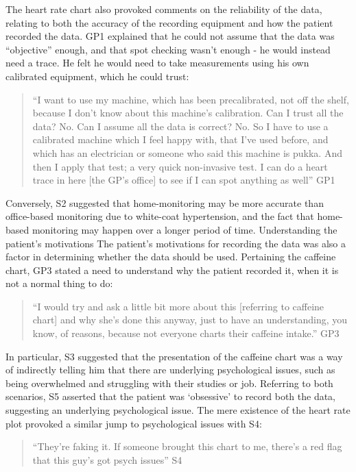 \documentclass{sigchi}
\begin{document}
The heart rate chart also provoked comments on the reliability of the data, relating to both the accuracy of the recording equipment and how the patient recorded the data. GP1 explained that he could not assume that the data was ``objective'' enough, and that spot checking wasn’t enough - he would instead need a trace. He felt he would need to take measurements using his own calibrated equipment, which he could trust:

\begin{quote}
    ``I want to use my machine, which has been precalibrated, not off the shelf, because I don't know about this machine's calibration. Can I trust all the data? No. Can I assume all the data is correct? No. So I have to use a calibrated machine which I feel happy with, that I've used before, and which has an electrician or someone who said this machine is pukka. And then I apply that test; a very quick non-invasive test. I can do a heart trace in here [the GP’s office] to see if I can spot anything as well'' GP1
\end{quote}

Conversely, S2 suggested that home-monitoring may be more accurate than office-based monitoring due to white-coat hypertension, and the fact that home-based monitoring may happen over a longer period of time.
Understanding the patient’s motivations
The patient’s motivations for recording the data was also a factor in determining whether the data should be used. Pertaining the caffeine chart, GP3 stated a need to understand why the patient recorded it, when it is not a normal thing to do:

\begin{quote}
    ``I would try and ask a little bit more about this [referring to caffeine chart] and why she's done this anyway, just to have an understanding, you know, of reasons, because not everyone charts their caffeine intake.'' GP3
\end{quote}

In particular, S3 suggested that the presentation of the caffeine chart was a way of indirectly telling him that there are underlying psychological issues, such as being overwhelmed and struggling with their studies or job. Referring to both scenarios, S5 asserted that the patient was ‘obsessive’ to record both the data, suggesting an underlying psychological issue. The mere existence of the heart rate plot provoked a similar jump to psychological issues with S4:

\begin{quote}
    ``They’re faking it. If someone brought this chart to me, there’s a red flag that this guy’s got psych issues'' S4
\end{quote}
\end{document}
